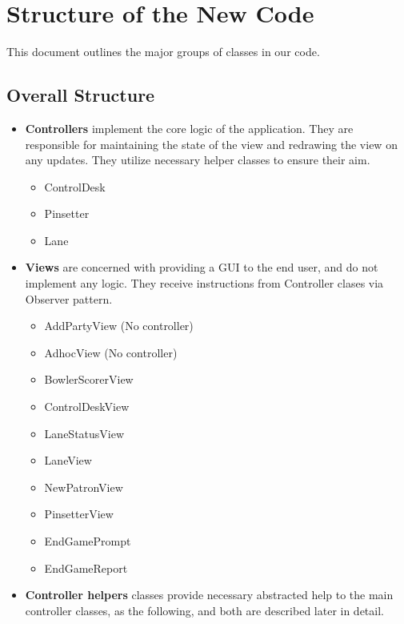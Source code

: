 \section{Structure of the New Code}

This document outlines the major groups of classes in our code.

\subsection{Overall Structure}

\begin{itemize}
    \item \textbf{Controllers} implement the core logic of the application. They are responsible for maintaining the state of the view and redrawing the view on any updates. They utilize necessary helper classes to ensure their aim.
          \begin{itemize}
              \item ControlDesk
              \item Pinsetter
              \item Lane
          \end{itemize}
    \item \textbf{Views} are concerned with providing a GUI to the end user, and do not implement any logic. They receive instructions from Controller clases via Observer pattern.
          \begin{itemize}
              \item AddPartyView (No controller)
              \item AdhocView (No controller)
              \item BowlerScorerView
              \item ControlDeskView
              \item LaneStatusView
              \item LaneView
              \item NewPatronView
              \item PinsetterView
              \item EndGamePrompt
              \item EndGameReport
          \end{itemize}
    \item \textbf{Controller helpers} classes provide necessary abstracted help to the main controller classes, as the following, and both are described later in detail.
          \begin{itemize}

\end{itemize}
\end{itemize}
